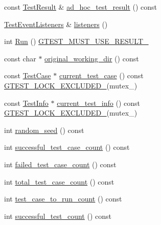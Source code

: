 \begin{DoxyCompactItemize}
\item 
const \hyperlink{classtesting_1_1_test_result}{Test\-Result} \& \hyperlink{classtesting_1_1_unit_test_ad9f058c36dab7e276322969160ed6f06}{ad\-\_\-hoc\-\_\-test\-\_\-result} () const 
\item 
\hyperlink{classtesting_1_1_test_event_listeners}{Test\-Event\-Listeners} \& \hyperlink{classtesting_1_1_unit_test_aac10085cf7c0d1751306db10cdd953cb}{listeners} ()
\item 
int \hyperlink{classtesting_1_1_unit_test_a2febc800536b44500565f4c423f359d3}{Run} () \hyperlink{gtest-port_8h_a8e5aab8276b2645f64f41c9e3021b935}{G\-T\-E\-S\-T\-\_\-\-M\-U\-S\-T\-\_\-\-U\-S\-E\-\_\-\-R\-E\-S\-U\-L\-T\-\_\-}
\item 
const char $\ast$ \hyperlink{classtesting_1_1_unit_test_adf043d0ac041bf2fd5dbae335e3d51a4}{original\-\_\-working\-\_\-dir} () const 
\item 
const \hyperlink{classtesting_1_1_test_case}{Test\-Case} $\ast$ \hyperlink{classtesting_1_1_unit_test_a158da6213cf0b2c6100e9cb1f8151e63}{current\-\_\-test\-\_\-case} () const \hyperlink{gtest-port_8h_a69abff5a4efdd07bd5faebe3dd318d06}{G\-T\-E\-S\-T\-\_\-\-L\-O\-C\-K\-\_\-\-E\-X\-C\-L\-U\-D\-E\-D\-\_\-}(mutex\-\_\-)
\item 
const \hyperlink{classtesting_1_1_test_info}{Test\-Info} $\ast$ \hyperlink{classtesting_1_1_unit_test_a02b6ab72bb9d93805bd0efbb099b4ccc}{current\-\_\-test\-\_\-info} () const \hyperlink{gtest-port_8h_a69abff5a4efdd07bd5faebe3dd318d06}{G\-T\-E\-S\-T\-\_\-\-L\-O\-C\-K\-\_\-\-E\-X\-C\-L\-U\-D\-E\-D\-\_\-}(mutex\-\_\-)
\item 
int \hyperlink{classtesting_1_1_unit_test_a6fa3161a230329e07fc31a339b682a20}{random\-\_\-seed} () const 
\item 
int \hyperlink{classtesting_1_1_unit_test_a1761c6274386032db8315156632eab6d}{successful\-\_\-test\-\_\-case\-\_\-count} () const 
\item 
int \hyperlink{classtesting_1_1_unit_test_a1084a93a4b92c6506738e309b0a9eeea}{failed\-\_\-test\-\_\-case\-\_\-count} () const 
\item 
int \hyperlink{classtesting_1_1_unit_test_a6802793a0be9cee17380fdd8c7161fcd}{total\-\_\-test\-\_\-case\-\_\-count} () const 
\item 
int \hyperlink{classtesting_1_1_unit_test_abb7330165eb5be7beac3f7e6ced5fcdd}{test\-\_\-case\-\_\-to\-\_\-run\-\_\-count} () const 
\item 
int \hyperlink{classtesting_1_1_unit_test_a4795d58351f03498d5823a743b0722c5}{successful\-\_\-test\-\_\-count} () const 

\end{DoxyCompactItemize}
